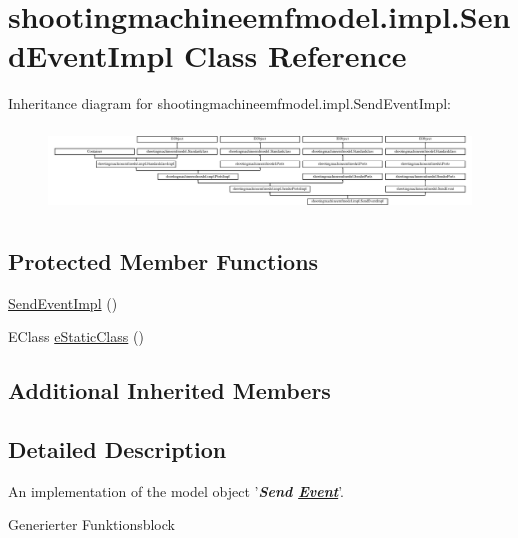 \hypertarget{classshootingmachineemfmodel_1_1impl_1_1_send_event_impl}{\section{shootingmachineemfmodel.\-impl.\-Send\-Event\-Impl Class Reference}
\label{classshootingmachineemfmodel_1_1impl_1_1_send_event_impl}
}
Inheritance diagram for shootingmachineemfmodel.\-impl.\-Send\-Event\-Impl\-:\begin{figure}[H]
\begin{center}
\leavevmode
\includegraphics[height=2.247492cm]{classshootingmachineemfmodel_1_1impl_1_1_send_event_impl}
\end{center}
\end{figure}
\subsection*{Protected Member Functions}
\begin{DoxyCompactItemize}
\item 
\hyperlink{classshootingmachineemfmodel_1_1impl_1_1_send_event_impl_a0a79f23f3dcf43c92684844e0c1154ac}{Send\-Event\-Impl} ()
\item 
E\-Class \hyperlink{classshootingmachineemfmodel_1_1impl_1_1_send_event_impl_ab5934ebd97ed14ce026199a64d9f6fe8}{e\-Static\-Class} ()
\end{DoxyCompactItemize}
\subsection*{Additional Inherited Members}


\subsection{Detailed Description}
An implementation of the model object '{\itshape {\bfseries Send \hyperlink{interfaceshootingmachineemfmodel_1_1_event}{Event}}}'.

Generierter Funktionsblock 

